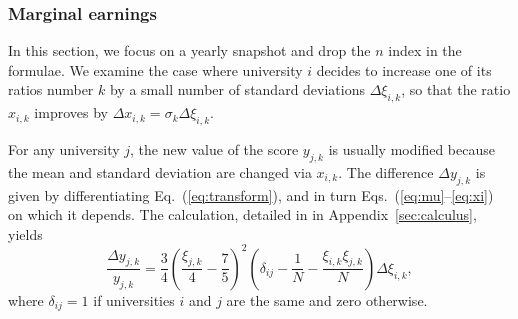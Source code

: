 \documentclass[twocolumn]{article}
\def\eqref#1{Eq.~(\ref{eq:#1})}
\def\eqsref#1#2{Eqs.~(\ref{eq:#1}--\ref{eq:#2})}
\begin{document}
\subsubsection{Marginal earnings}
\label{sec:marginal} 

In this section, we focus on a yearly snapshot and drop the $n$ index in the formulae.  We examine the case where university $i$ decides to increase one of its ratios number $k$ by a small number of standard deviations $\Delta\xi_{i,k}$, so that the ratio $x_{i,k}$ improves by $\Delta x_{i,k} = \sigma_k\Delta\xi_{i,k}$.

For any university $j$, the new value of the score $y_{j,k}$ is usually modified because the mean and standard deviation are changed via $x_{i,k}$.  The difference $\Delta y_{j,k}$ is given by differentiating \eqref{transform}, and in turn \eqsref{mu}{xi} on which it depends.
The calculation, detailed in  in Appendix~\ref{sec:calculus}, yields
\begin{equation}
    \frac{\Delta y_{j,k}}{y_{j,k}} = 
        \frac34 \left(\frac{\xi_{j,k}}4 -  \frac75\right)^2 
        \left(
            \delta_{ij} 
          - \frac 1N - \frac{\xi_{i,k}\xi_{j,k}}{N}
        \right)
        \Delta \xi_{i,k},
        \label{eq:modif}
\end{equation}
where $\delta_{ij} = 1$ if universities $i$ and $j$ are the same and zero otherwise.
\end{document}
